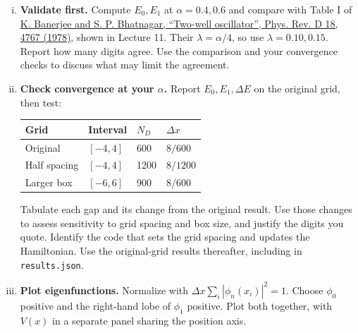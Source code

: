 \begin{problem}[10]
  \begin{enumerate}[(i)]
    \item \textbf{Validate first.} Compute $E_0,E_1$ at $\alpha=0.4,0.6$ and compare with Table I of \href{http://doi.org/10.1103/PhysRevD.18.4767}{K. Banerjee and S. P. Bhatnagar, ``Two-well oscillator'', Phys. Rev. D 18, 4767 (1978)}, shown in Lecture 11.
          Their $\lambda=\alpha/4$, so use $\lambda=0.10,0.15$.
          Report how many digits agree. Use the comparison and your convergence checks to discuss what may limit the agreement.
    \item \textbf{Check convergence at your $\alpha$.} Report $E_0,E_1,\Delta E$ on the original grid, then test:
          \begin{center}
            \begin{tabular}{@{}llll@{}}
              \toprule
              Grid & Interval & $N_D$ & $\Delta x$ \\
              \midrule
              Original & $[-4,4]$ & 600 & $8/600$ \\
              Half spacing & $[-4,4]$ & 1200 & $8/1200$ \\
              Larger box & $[-6,6]$ & 900 & $8/600$ \\
              \bottomrule
            \end{tabular}
          \end{center}
          Tabulate each gap and its change from the original result.
          Use those changes to assess sensitivity to grid spacing and box size, and justify the digits you quote.
          Identify the code that sets the grid spacing and updates the Hamiltonian.
          Use the original-grid results thereafter, including in \texttt{results.json}.
    \item \textbf{Plot eigenfunctions.} Normalize with $\Delta x\sum_i|\phi_n(x_i)|^2=1$.
          Choose $\phi_0$ positive and the right-hand lobe of $\phi_1$ positive.
          Plot both together, with $V(x)$ in a separate panel sharing the position axis.
  \end{enumerate}
\end{problem}

\begin{solution}
\end{solution}

